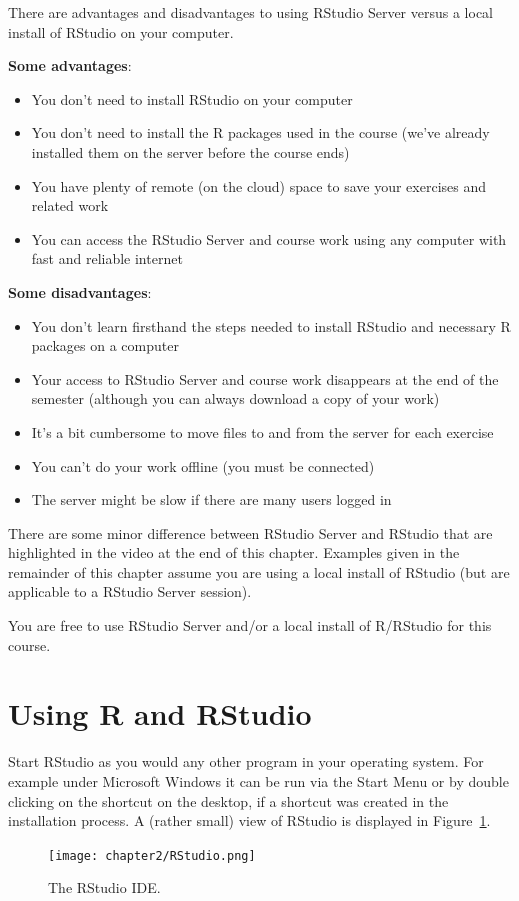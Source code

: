 There are advantages and disadvantages to using RStudio Server versus a local install of RStudio on your computer. 

\textbf{Some advantages}:
\begin{itemize}
\item You don't need to install RStudio on your computer
\item You don't need to install the R packages used in the course (we've already installed them on the server before the course ends)
\item You have plenty of remote (on the cloud) space to save your exercises and related work
\item You can access the RStudio Server and course work using any computer with fast and reliable internet
\end{itemize}

\textbf{Some disadvantages}: 
\begin{itemize}
\item You don't learn firsthand the steps needed to install RStudio and necessary R packages on a computer
\item Your access to RStudio Server and course work disappears at the end of the semester (although you can always download a copy of your work)
\item It's a bit cumbersome to move files to and from the server for each exercise
\item You can't do your work offline (you must be connected)
\item The server might be slow if there are many users logged in
\end{itemize}

There are some minor difference between RStudio Server and RStudio that are highlighted in the video at the end of this chapter. Examples given in the remainder of this chapter assume you are using a local install of RStudio (but are applicable to a RStudio Server session).

You are free to use RStudio Server and/or a local install of R/RStudio for this course.

\section{Using R and RStudio}
Start RStudio as you would any other program in your operating system. For example under Microsoft Windows it can be run via the Start Menu or by double clicking on the shortcut on the desktop, if a shortcut was created in the installation process.  A (rather small) view of RStudio is displayed in Figure~\ref{FIG:RSTUDIO}.
\begin{figure}[htbp]
\texttt{[image: chapter2/RStudio.png]}
\caption{The RStudio IDE.}
\label{FIG:RSTUDIO}
\end{figure}

